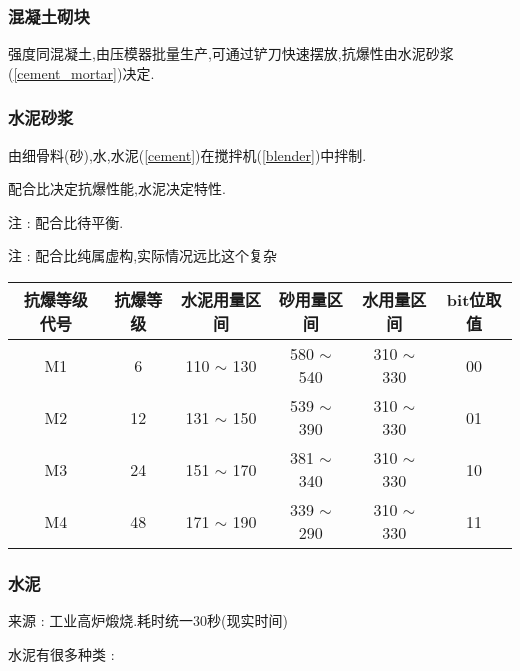 {{      \subsubsection{混凝土砌块}{
          强度同混凝土,由压模器批量生产,可通过铲刀快速摆放,抗爆性由水泥砂浆({\ref{cement_mortar}})决定.
      }

      \subsubsection{水泥砂浆}{
          由细骨料(砂),水,水泥({\ref{cement}})在搅拌机({\ref{blender}})中拌制.

          配合比决定抗爆性能,水泥决定特性.

          注 : 配合比待平衡.

          注 : 配合比纯属虚构,实际情况远比这个复杂

          \begin{center}
              \begin{tabular}{|c|c|c|c|c|c|}
                  \hline
                  抗爆等级代号 & 抗爆等级 & 水泥用量区间   & 砂用量区间     & 水用量区间     & bit位取值 \\
                  \hline
                  M1           & 6        & 110 $\sim$ 130 & 580 $\sim$ 540 & 310 $\sim$ 330 & 00        \\
                  \hline
                  M2           & 12       & 131 $\sim$ 150 & 539 $\sim$ 390 & 310 $\sim$ 330 & 01        \\
                  \hline
                  M3           & 24       & 151 $\sim$ 170 & 381 $\sim$ 340 & 310 $\sim$ 330 & 10        \\
                  \hline
                  M4           & 48       & 171 $\sim$ 190 & 339 $\sim$ 290 & 310 $\sim$ 330 & 11        \\
                  \hline
              \end{tabular}
          \end{center}
      }\label{cement_mortar}

      \subsubsection{水泥}{
          来源 : 工业高炉煅烧.耗时统一30秒(现实时间)

          水泥有很多种类 :

}}}
